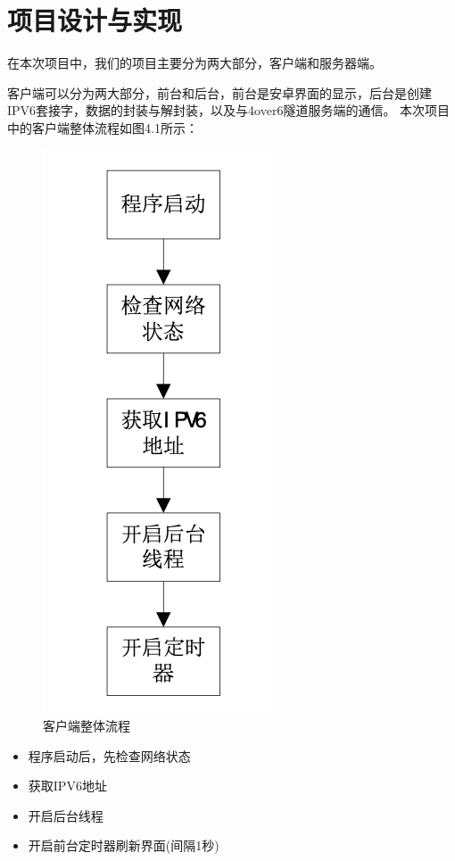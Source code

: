 \chapter{项目设计与实现}
在本次项目中，我们的项目主要分为两大部分，客户端和服务器端。

客户端可以分为两大部分，前台和后台，前台是安卓界面的显示，后台是创建IPV6套接字，数据的封装与解封装，以及与4over6隧道服务端的通信。
本次项目中的客户端整体流程如图4.1所示：
\begin{figure}[!ht]
	\begin{center}
	\includegraphics[scale=.58]{client_all.png}
	\end{center}
	\caption{客户端整体流程}
	\label{figure:客户端整体流程图}
\end{figure}

\begin{itemize}
  \item 程序启动后，先检查网络状态
  \item 获取IPV6地址
  \item 开启后台线程
  \item 开启前台定时器刷新界面(间隔1秒)
\end{itemize}

